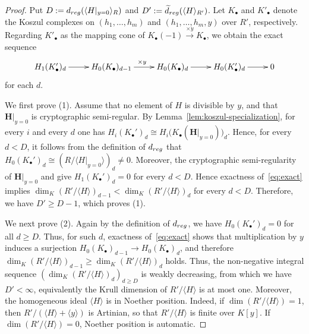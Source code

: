 \documentclass{article}
\theoremstyle{definition}
\theoremstyle{plain}
\theoremstyle{plain}
\theoremstyle{plain}
\theoremstyle{plain}
\numberwithin{equation}{subsection}
\begin{document}
\begin{proof}
Put $D:=d_{\rm reg}(\langle H|_{y=0} \rangle_R)$ and $D':=\widetilde{d}_{\rm reg}(\langle H \rangle_{R'})$.
Let $K_\bullet$ and $K'_\bullet$ denote the Koszul complexes on $(h_1,\ldots,h_m)$ and $(h_1,\ldots,h_m,y)$ over $R'$, respectively.
Regarding $K'_\bullet$ as the mapping cone of $K_\bullet(-1)\xrightarrow{\times y}K_\bullet$, we obtain the exact sequence
\begin{equation}\label{eq:exact}
{
	\xymatrix{
	  H_{1}(K_{\bullet}')_d \ar[r] & H_{0}(K_{\bullet})_{d-1} \ar[r]^{\times y} & H_{0}(K_{\bullet})_d \ar[r] & H_{0}(K_{\bullet}')_d \ar[r] & 0    \\
	}}
\end{equation}
for each $d$.

We first prove (1).
Assume that no element of $H$ is divisible by $y$, and that
$\bm H|_{y=0}$ is cryptographic semi-regular.
By Lemma~\ref{lem:koszul-specialization}, for every $i$ and every $d$ one has $H_i(K_\bullet')_d \cong H_i\bigl(K_\bullet(\bm H|_{y=0})\bigr)_d$.
Hence, for every $d<D$, it follows from the definition of $d_{\rm reg}$ that $H_0(K_\bullet')_d\cong (R/\langle H|_{y=0}\rangle)_d \neq0$.
Moreover, the cryptographic semi-regularity of $\bm H|_{y=0}$ and \cite[Theorem~1]{Diem2} give $H_1(K_\bullet')_d=0$ for every $d<D$.
Hence exactness of~\eqref{eq:exact} implies $\dim_K(R'/\langle H\rangle)_{d-1}< \dim_K(R'/\langle H\rangle)_d$ for every $d<D$.
Therefore, we have $D' \geq D-1$, which proves (1).

We next prove (2).
Again by the definition of $d_{\rm reg}$, we have $H_0(K_{\bullet}')_d =0$ for all $d \geq D$.
Thus, for such $d$, exactness of~\eqref{eq:exact} shows that multiplication by $y$ induces a surjection $H_0(K_\bullet)_{d-1}\to H_0(K_\bullet)_d$, and therefore $\dim_K(R'/\langle H \rangle)_{d-1} \geq \dim_K (R'/\langle H \rangle)_{d}$ holds. 
Thus, the non-negative integral sequence $\left(\dim_K(R'/\langle H\rangle)_d\right)_{d\geq D}$ is weakly decreasing, from which we have $D'<\infty$, equivalently the Krull dimension of $R'/\langle H \rangle$ is at most one.
Moreover, the homogeneous ideal $\langle H\rangle$ is in Noether position.
Indeed, if $\dim(R'/\langle H\rangle)=1$, then $R'/(\langle H\rangle+\langle y\rangle)$ is Artinian, so that $R'/\langle H\rangle$ is finite over $K[y]$.
If $\dim(R'/\langle H\rangle)=0$, Noether position is automatic.


\end{proof}
\end{document}
